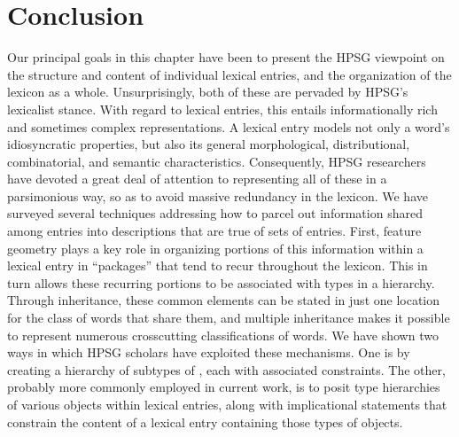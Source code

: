 \documentclass[output=paper]{langsci/langscibook}
\begin{document}

\section{Conclusion}

Our principal goals in this chapter have been to present the HPSG viewpoint on the structure and content of individual lexical entries, and the organization of the lexicon as a whole.
Unsurprisingly, both of these are pervaded by HPSG's lexicalist stance.
With regard to lexical entries, this entails informationally rich and sometimes complex representations. 
A lexical entry models not only a word's idiosyncratic properties, but also its general morphological, distributional, combinatorial, and semantic characteristics.
Consequently, HPSG researchers have devoted a great deal of attention to representing all of these in a parsimonious way, so as to avoid massive redundancy in the lexicon.
We have surveyed several techniques addressing how to parcel out information shared among entries into descriptions that are true of sets of entries.
First, feature geometry plays a key role in organizing portions of this information within a lexical entry in ``packages'' that tend to recur throughout the lexicon.
This in turn allows these recurring portions to be associated with types in a hierarchy.
Through inheritance, these common elements can be stated in just one location for the class of words that share them, and multiple inheritance makes it possible to represent numerous crosscutting classifications of words.
We have shown two ways in which HPSG scholars have exploited these mechanisms.
One is by creating a hierarchy of subtypes of , each with associated constraints.
The other, probably more commonly employed in current work, is to posit type hierarchies of various objects within lexical entries, along with implicational statements that constrain the content of a lexical entry containing those types of objects.
\end{document}
